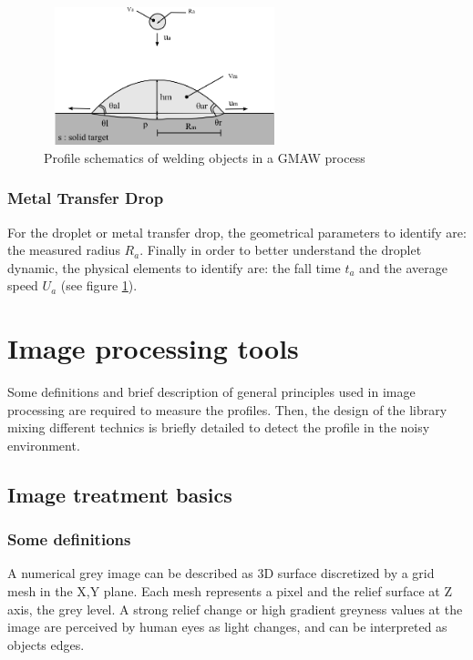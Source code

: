 \documentclass[12pt]{iopart}
\begin{document}
\begin{figure}
\begin{center}
\includegraphics[width=7cm,height=4cm]{images/schema-macro-drop-droplet-parameters.png}
\caption{{\small Profile schematics of welding objects in a GMAW process}}
\label{fig::schema-macro-drop-droplet-parameters}
\end{center}
\end{figure}
    
\subsubsection{ Metal Transfer Drop}
\label{ metam_transfer_drop}

For the droplet or metal transfer drop, the geometrical parameters to identify are:
 the measured radius $R_{a}$. 
Finally in order to better understand the droplet dynamic, 
the physical elements to identify are: the fall time $t_{a}$ and the average 
speed $U_{a}$ (see figure \ref{fig::schema-macro-drop-droplet-parameters}).



\section{Image processing tools} 
\label{ image_processing_tools}

Some definitions and brief description of general principles used in
 image processing are required to measure the profiles. Then, the design of the library 
mixing different technics
is briefly detailed  to detect the profile in the noisy environment.


\subsection{Image treatment basics}
\subsubsection{Some definitions}
\label{some_definitions}

A numerical grey image can be described as 3D surface discretized by a grid mesh
 in the X,Y plane. Each mesh represents a pixel and the relief surface at Z axis,
 the grey level. 
A strong relief change or high gradient greyness values at
 the image are perceived by human eyes as light changes, and can be interpreted
 as objects edges. 
\end{document}
